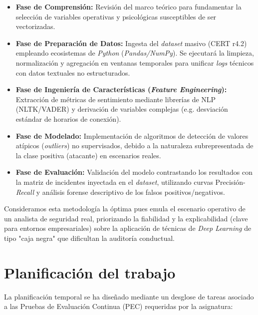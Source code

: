 \documentclass[IB]{TFUOC}%
\begin{document}
\begin{itemize}
    \item \textbf{Fase de Comprensión:} Revisión del marco teórico para fundamentar la selección de variables operativas y psicológicas susceptibles de ser vectorizadas.
    \item \textbf{Fase de Preparación de Datos:} Ingesta del \textit{dataset} masivo (CERT r4.2) empleando ecosistemas de \textit{Python} (\textit{Pandas/NumPy}). Se ejecutará la limpieza, normalización y agregación en ventanas temporales para unificar \textit{logs} técnicos con datos textuales no estructurados.
    \item \textbf{Fase de Ingeniería de Características (\textit{Feature Engineering}):} Extracción de métricas de sentimiento mediante librerías de NLP (NLTK/VADER) y derivación de variables complejas (e.g. desviación estándar de horarios de conexión).
    \item \textbf{Fase de Modelado:} Implementación de algoritmos de detección de valores atípicos (\textit{outliers}) no supervisados, debido a la naturaleza subrepresentada de la clase positiva (atacante) en escenarios reales.
    \item \textbf{Fase de Evaluación:} Validación del modelo contrastando los resultados con la matriz de incidentes inyectada en el \textit{dataset}, utilizando curvas Precisión-\textit{Recall} y análisis forense descriptivo de los falsos positivos/negativos.
\end{itemize}

\noindent Consideramos esta metodología la óptima pues emula el escenario operativo de un analista de seguridad real, priorizando la fiabilidad y la explicabilidad (clave para entornos empresariales) sobre la aplicación de técnicas de \textit{Deep Learning} de tipo "caja negra" que dificultan la auditoría conductual.


\section{Planificación del trabajo}

La planificación temporal se ha diseñado mediante un desglose de tareas asociado a las Pruebas de Evaluación Continua (PEC) requeridas por la asignatura:
\end{document}
